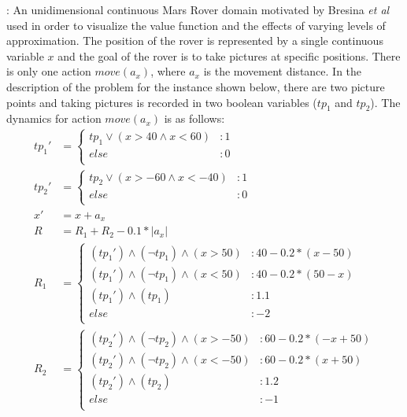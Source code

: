 \MarsRoverUni:
An unidimensional continuous Mars Rover domain motivated by
Bresina {\it et al}~\cite{bresina02} used in order to visualize the
value function and the effects of varying levels of approximation.
The position of the rover is represented by a single continuous
variable $x$ and the goal of the rover is to take pictures at
specific positions.  There is only one action $\mathit{move}(a_x)$,
where $a_x$ is the movement distance. In the description of the
problem for the instance shown below, there are two picture
points and taking pictures is recorded in two boolean variables
($tp_1$ and $tp_2$). The dynamics for action $move(a_x)$ is as
follows: {\footnotesize
\vspace{-2mm}
\begin{align*}
tp_1' &= \begin{cases}
tp_1 \vee (x>40 \wedge x<60)&: 1\\
else&: 0\\
\end{cases}\\
tp_2' &= \begin{cases}
tp_2 \vee (x>-60 \wedge x<-40)&: 1\\
else&: 0\\
\end{cases}\\
x' &=  x +a_x\\
R & = R_1 + R_2 - 0.1*|a_x|\\
R_1 & = \begin{cases} 
(tp_1') \wedge (\neg tp_1) \wedge (x > 50) &: 40 - 0.2*(x -50)\\
(tp_1') \wedge (\neg tp_1) \wedge (x < 50) &: 40 - 0.2*(50-x)\\
(tp_1') \wedge ( tp_1) &:  1.1\\
else &: -2\\
\end{cases} \\
R_2 & = \begin{cases} 
(tp_2') \wedge (\neg tp_2) \wedge (x > -50) &: 60 - 0.2*(-x +50)\\
(tp_2') \wedge (\neg tp_2) \wedge (x < -50) &: 60 - 0.2*(x +50)\\
(tp_2') \wedge ( tp_2) &:  1.2\\
else &: -1\\
\end{cases} \\
\end{align*} }
\vspace{-12 mm}

